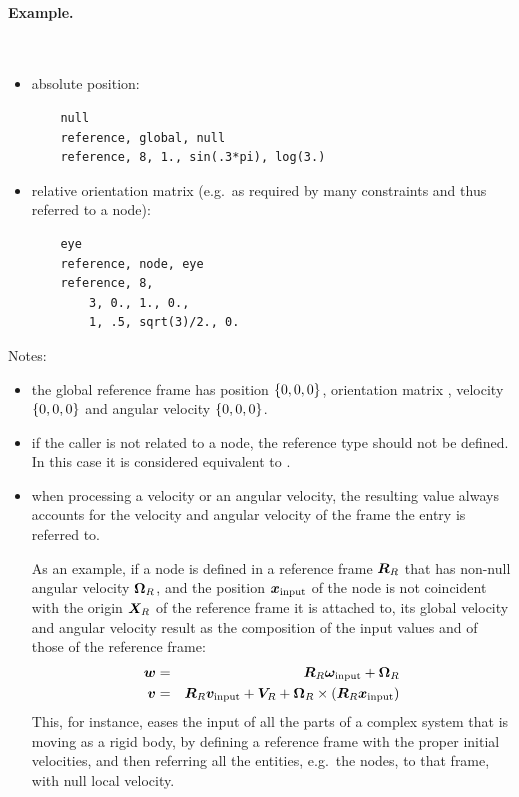 \paragraph{Example.} \
\begin{itemize}
    \item absolute position:
    \begin{verbatim}
    null
    reference, global, null
    reference, 8, 1., sin(.3*pi), log(3.)
    \end{verbatim}
    \item relative orientation matrix (e.g.\ as required by many constraints and
    thus referred to a node):
    \begin{verbatim}
    eye
    reference, node, eye
    reference, 8,
        3, 0., 1., 0., 
        1, .5, sqrt(3)/2., 0.
    \end{verbatim}
\end{itemize}
Notes: 
\begin{itemize}
    \item the global reference frame has position $ \left\{ 0, 0, 0 \right\} $,
    orientation matrix \kw{eye}, velocity $ \left\{ 0, 0, 0 \right\} $ and angular
    velocity $ \left\{ 0, 0, 0 \right\} $.
    \item if the caller is not related to a node, the reference type
    \kw{node} should not be defined. 
    In this case it is considered equivalent to .
    \item when processing a velocity or an angular velocity, the resulting
    value always accounts for the velocity and angular velocity of the frame
    the entry is referred to. 

    As an example, if a node is defined in a reference frame $\boldsymbol{R}_R$
    that has non-null angular velocity $ \boldsymbol{\Omega}_R $, and the position 
    $ \boldsymbol{x}_{\text{input}} $ of the node is not coincident
    with the origin $ \boldsymbol{X}_R $ of the reference frame
    it is attached to, its global velocity and angular velocity result
    as the composition of the input values and of those of the reference 
    frame:
    \begin{eqnarray*}    
        \boldsymbol{w} & = & \boldsymbol{R}_R \boldsymbol{\omega}_{\text{input}} + \boldsymbol{\Omega}_R \\
	\boldsymbol{v} & = & \boldsymbol{R}_R \boldsymbol{v}_{\text{input}} + \boldsymbol{V}_R
		+\boldsymbol{\Omega}_R\times\left( \boldsymbol{R}_R \boldsymbol{x}_{\text{input}} \right)
    \end{eqnarray*}
    This, for instance, eases the input of all the parts of a complex system
    that is moving as a rigid body, by defining a reference frame with the
    proper initial velocities, and then referring all the entities, e.g.\ the 
    nodes, to that frame, with null local velocity.
\end{itemize}  
